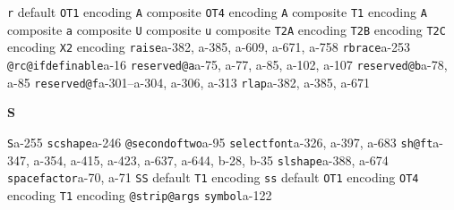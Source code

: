 \documentclass[twoside]{ltxdoc}
\makeatletter
\renewenvironment{theindex}{%
   \@restonecoltrue
   \if@twocolumn\@restonecolfalse\fi
   \columnseprule \z@
   \columnsep 35\p@
   \twocolumn[\index@prologue]%
   \IndexParms
   \let\item\@idxitem
   \ignorespaces
}{\if@restonecol\onecolumn\else\clearpage\fi}
\makeatother
\begin{document}
\begin{theindex}
  \item \texttt  {r}\efill 
    \subitem default\pfill {}
    \subitem \texttt  {OT1} encoding\pfill {}
      \subsubitem \texttt  {A} composite\pfill {}
    \subitem \texttt  {OT4} encoding\pfill {}
      \subsubitem \texttt  {A} composite\pfill {}
    \subitem \texttt  {T1} encoding\pfill {}
      \subsubitem \texttt  {A} composite\pfill {}
      \subsubitem \texttt  {a} composite\pfill {}
      \subsubitem \texttt  {U} composite\pfill {}
      \subsubitem \texttt  {u} composite\pfill {}
    \subitem \texttt  {T2A} encoding\pfill {}
    \subitem \texttt  {T2B} encoding\pfill {}
    \subitem \texttt  {T2C} encoding\pfill {}
    \subitem \texttt  {X2} encoding\pfill {}
  \item \texttt  {raise}\pfill a-382, a-385, a-609, 
                a-671, a-758
  \item \texttt  {rbrace}\pfill a-253
  \item \texttt  {@rc@ifdefinable}\pfill a-16
  \item \texttt  {reserved@a}\pfill a-75, a-77, a-85, 
                a-102, a-107
  \item \texttt  {reserved@b}\pfill a-78, a-85
  \item \texttt  {reserved@f}\pfill a-301--a-304, a-306, 
                a-313
  \item \texttt  {rlap}\pfill a-382, a-385, a-671

  \indexspace
{\bfseries\hfil S\hfil}\nopagebreak

  \item \texttt  {S}\pfill a-255
  \item \texttt  {scshape}\pfill a-246
  \item \texttt  {@secondoftwo}\pfill a-95
  \item \texttt  {selectfont}\pfill a-326, a-397, a-683
  \item \texttt  {sh@ft}\pfill a-347, a-354, a-415, 
                a-423, a-637, a-644, b-28, b-35
  \item \texttt  {slshape}\pfill a-388, a-674
  \item \texttt  {spacefactor}\pfill a-70, a-71
  \item \texttt  {SS}\efill 
    \subitem default\pfill {}
    \subitem \texttt  {T1} encoding\pfill {}
  \item \texttt  {ss}\efill 
    \subitem default\pfill {}
    \subitem \texttt  {OT1} encoding\pfill {}
    \subitem \texttt  {OT4} encoding\pfill {}
    \subitem \texttt  {T1} encoding\pfill {}
  \item \texttt  {@strip@args}\pfill {}
  \item \texttt  {symbol}\pfill a-122


\end{theindex}
\end{document}
